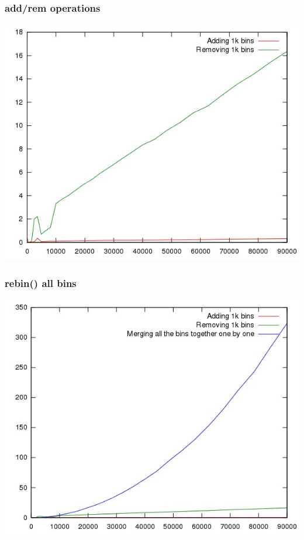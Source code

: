 \documentclass{beamer}
\begin{document}
  \begin{frame}
    \frametitle{add/rem operations}
    \includegraphics[height=0.89\textheight]{2.jpg}
  \end{frame}
  \begin{frame}
    \frametitle{rebin() all bins}
    \includegraphics[height=0.89\textheight]{2a.jpg}
  \end{frame}
\end{document}
